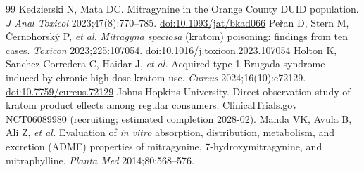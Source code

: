 \documentclass[10pt,a4paper]{article}
\begin{document}
\begin{thebibliography}{99}
 Kedzierski N, Mata DC. Mitragynine in the Orange County DUID population. \emph{J Anal Toxicol} 2023;47(8):770--785.
\href{https://doi.org/10.1093/jat/bkad066}{doi:10.1093/jat/bkad066}
 Peřan D, Stern M, Černohorský P, \emph{et al.} \emph{Mitragyna speciosa} (kratom) poisoning: findings from ten cases.
\emph{Toxicon} 2023;225:107054. \href{https://doi.org/10.1016/j.toxicon.2023.107054}{doi:10.1016/j.toxicon.2023.107054}
 Holton K, Sanchez Corredera C, Haidar J, \emph{et al.} Acquired type 1 Brugada syndrome induced by chronic high-dose kratom use.
\emph{Cureus} 2024;16(10):e72129. \href{https://doi.org/10.7759/cureus.72129}{doi:10.7759/cureus.72129}
 Johns Hopkins University. Direct observation study of kratom product effects among regular consumers.
ClinicalTrials.gov NCT06089980 (recruiting; estimated completion 2028-02).
 Manda VK, Avula B, Ali Z, \emph{et al.} Evaluation of \emph{in vitro} absorption, distribution, metabolism, and
excretion (ADME) properties of mitragynine, 7-hydroxymitragynine, and mitraphylline. \emph{Planta Med} 2014;80:568--576.
\end{thebibliography}
\end{document}
